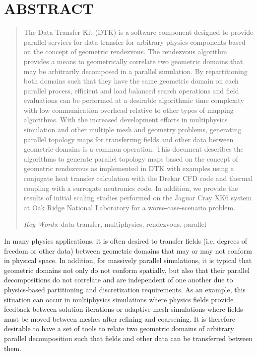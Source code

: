 \documentclass{mc2013}
\begin{document}
\section*{ABSTRACT} 
\begin{quote}
\begin{small}
The Data Transfer Kit (DTK) is a software component designed to
provide parallel services for data transfer for arbitrary physics
components based on the concept of geometric rendezvous. The
rendezvous algorithm provides a means to geometrically correlate two
geometric domains that may be arbitrarily decomposed in a parallel
simulation. By repartitioning both domains such that they have the
same geometric domain on each parallel process, efficient and load
balanced search operations and field evaluations can be performed at a
desirable algorithmic time complexity with low communication overhead
relative to other types of mapping algorithms. With the increased
development efforts in multiphysics simulation and other multiple mesh
and geometry problems, generating parallel topology maps for
transferring fields and other data between geometric domains is a
common operation. This document describes the algorithms to generate
parallel topology maps based on the concept of geometric rendezvous as
implemented in DTK with examples using a conjugate heat transfer
calculation with the Drekar CFD code and thermal coupling with a
surrogate neutronics code. In addition, we provide the results of
initial scaling studies performed on the Jaguar Cray XK6 system at Oak
Ridge National Laboratory for a worse-case-scenario problem.


\emph{Key Words}: data transfer, multiphysics, rendezvous, parallel
\end{small} 
\end{quote}

\setlength{\baselineskip}{14pt}
\normalsize

\label{sec:intro}

In many physics applications, it is often desired to transfer fields
(i.e. degrees of freedom or other data) between geometric domains that
may or may not conform in physical space. In addition, for massively
parallel simulations, it is typical that geometric domains not only do
not conform spatially, but also that their parallel decompositions do
not correlate and are independent of one another due to physics-based
partitioning and discretization requirements. As an example, this
situation can occur in multiphysics simulations where physics fields
provide feedback between solution iterations or adaptive mesh
simulations where fields must be moved between meshes after refining
and coarsening. It is therefore desirable to have a set of tools to
relate two geometric domains of arbitrary parallel decomposition such
that fields and other data can be transferred between them.
\end{document}
